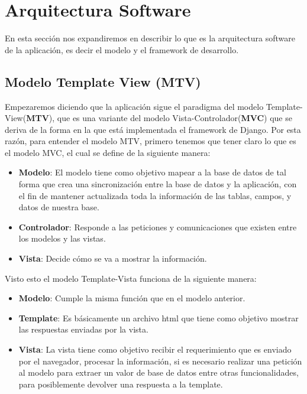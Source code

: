 \section{Arquitectura Software}
\label{2:sec2}

En esta sección nos expandiremos en describir lo que es la arquitectura software de la aplicación, es decir el modelo y el framework de desarrollo.\\


\subsection{Modelo Template View (MTV)}
Empezaremos diciendo que la aplicación sigue el paradigma del modelo Template-View(\textbf{MTV}), que es una variante del modelo Vista-Controlador(\textbf{MVC}) que
se deriva de la forma en la que está implementada el framework de Django. Por esta razón, para entender el modelo MTV, primero tenemos que tener claro lo que es el modelo MVC, el cual se define de la siguiente manera:\\

\begin{itemize}
  \item \textbf{Modelo}: El modelo tiene como objetivo mapear a la base de datos de tal forma que crea una sincronización
			  entre la base de datos y la aplicación, con el fin de mantener actualizada toda la información de 
			  las tablas, campos, y datos de nuestra base. 
  \item \textbf{Controlador}: Responde a las peticiones y comunicaciones que existen entre los modelos y las vistas.
  \item \textbf{Vista}: Decide cómo se va a mostrar la información. 
\end{itemize}

Visto esto el modelo Template-Vista funciona de la siguiente manera:\\


\begin{itemize}
  \item \textbf{Modelo}: Cumple la misma función que en el modelo anterior.
  \item \textbf{Template}: Es básicamente un archivo html que tiene como objetivo mostrar las respuestas enviadas por la vista.
  \item \textbf{Vista}: La vista tiene como objetivo recibir el requerimiento que es enviado por el navegador, procesar la información,
			 si es necesario realizar una petición al modelo para extraer un valor de base de datos entre otras funcionalidades, para posiblemente
			 devolver una respuesta a la template.
\end{itemize}


